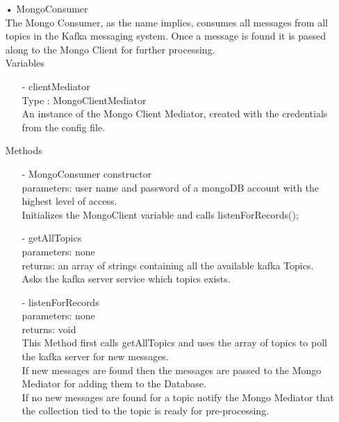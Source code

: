 \documentclass[oneside, english, final]{design}
\begin{document}
\begin{itemize}
	\item[•]MongoConsumer
	      \\The Mongo Consumer, as the name implies, consumes all messages from all topics in the Kafka messaging system. Once a message is found it is passed along to the Mongo Client for further processing.
	      \\Variables
	      \begin{itemize}
		      \item[-]clientMediator
		            \\Type : MongoClientMediator
		            \\ An instance of the Mongo Client Mediator, created with the credentials from the config file.
	      \end{itemize}
	      Methods
	      \begin{itemize}
		      \item[-]MongoConsumer constructor
		            \\parameters: user name and password of a mongoDB account with the highest level of access.
		            \\ Initializes the MongoClient variable and calls listenForRecords();
		      \item[-]getAllTopics
		            \\parameters: none
		            \\returns: an array of strings containing all the available kafka Topics.
		            \\Asks the kafka server service which topics exists.
		      \item[-]listenForRecords
		            \\parameters: none
		            \\returns: void
		            \\This Method first calls getAllTopics and uses the array of topics to poll the kafka server for new messages.
		            \\If new messages are found then the messages are passed to the Mongo Mediator for adding them to the Database.
		            \\If no new messages are found for a topic notify the Mongo Mediator that the collection tied to the topic is ready for pre-processing.
	      \end{itemize}




\end{itemize}
\end{document}
